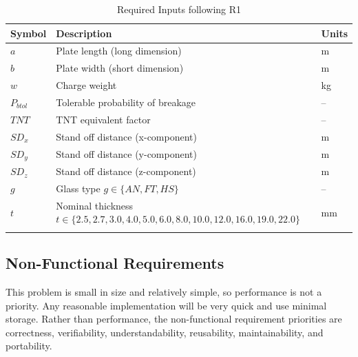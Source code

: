 \documentclass[12pt]{article}
\begin{document}
\begin{longtabu}{l X[l] l}
\toprule
Symbol & Description & Units
\\
\midrule
$a$ & Plate length (long dimension) & m
\\
$b$ & Plate width (short dimension) & m
\\
$w$ & Charge weight & kg
\\
${P_{btol}}$ & Tolerable probability of breakage & --
\\
$TNT$ & TNT equivalent factor & --
\\
${SD_{x}}$ & Stand off distance (x-component) & m
\\
${SD_{y}}$ & Stand off distance (y-component) & m
\\
${SD_{z}}$ & Stand off distance (z-component) & m
\\
$g$ & Glass type $g\in{}\{AN,FT,HS\}$ & --
\\
$t$ & Nominal thickness $t\in{}\{2.5,2.7,3.0,4.0,5.0,6.0,8.0,10.0,12.0,16.0,19.0,22.0\}$ & mm
\\
\bottomrule
\caption{Required Inputs following R1}
\label{Table:R1ReqInputs}
\end{longtabu}
\subsection{Non-Functional Requirements}
\label{Sec:NFRs}
This problem is small in size and relatively simple, so performance is not a priority. Any reasonable implementation will be very quick and use minimal storage. Rather than performance, the non-functional requirement priorities are correctness, verifiability, understandability, reusability, maintainability, and portability.
\end{document}
